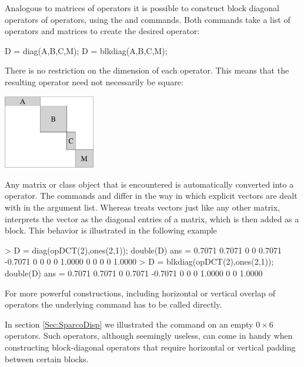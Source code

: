 Analogous to matrices of operators it is possible to construct block
diagonal operators of operators, using the  and
 commands. Both commands take a list of operators and
matrices to create the desired operator:
\begin{codeblock}
D = diag(A,B,C,M);
D = blkdiag(A,B,C,M);
\end{codeblock}
There is no restriction on the dimension of each operator. This means
that the resulting operator need not necessarily be square:
\begin{center}
\includegraphics[width=4cm]{./FigSparcoBlockDiag1}
\end{center}
Any matrix or class object that is encountered is automatically
converted into a \spot{} operator. The commands  and
 differ in the way in which explicit vectors are dealt
with in the argument list. Whereas  treats vectors just
like any other matrix,  interprets the vector as the
diagonal entries of a matrix, which is then added as a block. This
behavior is illustrated in the following example
\begin{codeblock}
> D = diag(opDCT(2),ones(2,1)); double(D)
ans =
    0.7071    0.7071         0         0
    0.7071   -0.7071         0         0
         0         0    1.0000         0
         0         0         0    1.0000
> D = blkdiag(opDCT(2),ones(2,1)); double(D)
ans =
    0.7071    0.7071         0
    0.7071   -0.7071         0
         0         0    1.0000
         0         0    1.0000
\end{codeblock}
For more powerful constructions, including horizontal or vertical
overlap of operators the underlying command  has to
be called directly.

In section \ref{Sec:SparcoDisp} we illustrated the 
command on an empty $0\times 6$ operators. Such operators, although
seemingly useless, can come in handy when constructing block-diagonal
operators that require horizontal or vertical padding between certain
blocks.

